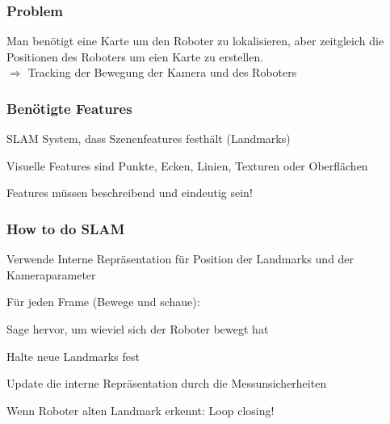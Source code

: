 \subsubsection{Problem}
Man benötigt eine Karte um den Roboter zu lokalisieren, aber zeitgleich die
Positionen des Roboters um eien Karte zu erstellen. \\
$\Rightarrow$ Tracking der Bewegung der Kamera und des Roboters

\subsubsection{Benötigte Features}
\begin{compactitem}
    \item SLAM System, dass Szenenfeatures festhält (Landmarks)
    \item Visuelle Features sind Punkte, Ecken, Linien, Texturen oder Oberflächen
    \item Features müssen beschreibend und eindeutig sein!
\end{compactitem}

\subsubsection{How to do SLAM}
\begin{compactitem}
    \item Verwende Interne Repräsentation für Position der Landmarks und der Kameraparameter
    \item Für jeden Frame (Bewege und schaue):
    \begin{compactitem}
        \item Sage hervor, um wieviel sich der Roboter bewegt hat
        \item Halte neue Landmarks fest
        \item Update die interne Repräsentation durch die Messunsicherheiten
    \end{compactitem}
    Wenn Roboter alten Landmark erkennt: Loop closing!
\end{compactitem}
